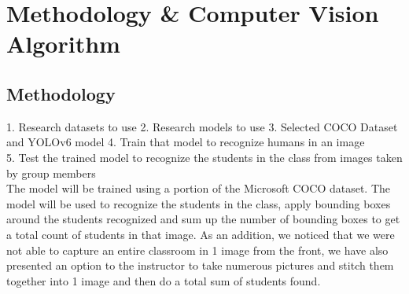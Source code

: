 \section{Methodology \& Computer Vision Algorithm}
\label{sec:method}
\subsection{Methodology}
\label{subsec:method}
1. Research datasets to use \cite{YOLOpaper2}
2. Research models to use 
3. Selected COCO Dataset and YOLOv6 \cite{YOLOpaper1} model
4. Train that model to recognize humans in an image\\
5. Test the trained model to recognize the students in the class from images taken by group members\\

The model will be trained using a portion of the Microsoft COCO dataset. The model will be used to recognize the students in the class, apply bounding boxes around the students recognized and sum up the number of bounding boxes to get a total count of students in that image. As an addition, we noticed that we were not able to capture an entire classroom in 1 image from the front, we have also presented an option to the instructor to take numerous pictures and stitch them together into 1 image and then do a total sum of students found.\\ 

